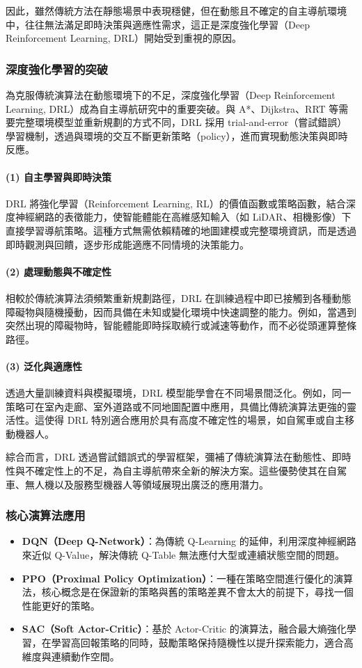 \documentclass[12pt,a4paper]{ctexart}
\begin{document}
因此，雖然傳統方法在靜態場景中表現穩健，但在動態且不確定的自主導航環境中，往往無法滿足即時決策與適應性需求，這正是深度強化學習（Deep Reinforcement Learning, DRL）開始受到重視的原因。


\subsubsection{深度強化學習的突破}
為克服傳統演算法在動態環境下的不足，深度強化學習（Deep Reinforcement Learning, DRL）成為自主導航研究中的重要突破。與 A*、Dijkstra、RRT 等需要完整環境模型並重新規劃的方式不同，DRL 採用 trial-and-error（嘗試錯誤）學習機制，透過與環境的交互不斷更新策略（policy），進而實現動態決策與即時反應。

\paragraph{(1) 自主學習與即時決策}
DRL 將強化學習（Reinforcement Learning, RL）的價值函數或策略函數，結合深度神經網路的表徵能力，使智能體能在高維感知輸入（如 LiDAR、相機影像）下直接學習導航策略。這種方式無需依賴精確的地圖建模或完整環境資訊，而是透過即時觀測與回饋，逐步形成能適應不同情境的決策能力。

\paragraph{(2) 處理動態與不確定性}
相較於傳統演算法須頻繁重新規劃路徑，DRL 在訓練過程中即已接觸到各種動態障礙物與隨機擾動，因而具備在未知或變化環境中快速調整的能力。例如，當遇到突然出現的障礙物時，智能體能即時採取繞行或減速等動作，而不必從頭運算整條路徑。

\paragraph{(3) 泛化與適應性}
透過大量訓練資料與模擬環境，DRL 模型能學會在不同場景間泛化。例如，同一策略可在室內走廊、室外道路或不同地圖配置中應用，具備比傳統演算法更強的靈活性。這使得 DRL 特別適合應用於具有高度不確定性的場景，如自駕車或自主移動機器人。

\noindent 綜合而言，DRL 透過嘗試錯誤式的學習框架，彌補了傳統演算法在動態性、即時性與不確定性上的不足，為自主導航帶來全新的解決方案。這些優勢使其在自駕車、無人機以及服務型機器人等領域展現出廣泛的應用潛力。

\subsubsection{核心演算法應用}
\begin{itemize}
  \item \textbf{DQN（Deep Q-Network）}：為傳統 Q-Learning 的延伸，利用深度神經網路來近似 Q-Value，解決傳統 Q-Table 無法應付大型或連續狀態空間的問題。
  \item \textbf{PPO（Proximal Policy Optimization）}：一種在策略空間進行優化的演算法，核心概念是在保證新的策略與舊的策略差異不會太大的前提下，尋找一個性能更好的策略。
  \item \textbf{SAC（Soft Actor-Critic）}：基於 Actor-Critic 的演算法，融合最大熵強化學習，在學習高回報策略的同時，鼓勵策略保持隨機性以提升探索能力，適合高維度與連續動作空間。
\end{itemize}
\end{document}
